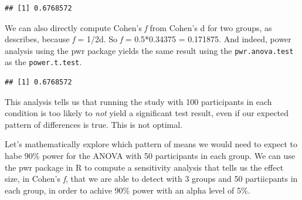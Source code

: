 \documentclass[
]{book}
\newenvironment{Shaded}{\begin{snugshade}}{\end{snugshade}}
\newcommand{\DataTypeTok}[1]{\textcolor[rgb]{0.13,0.29,0.53}{#1}}
\newcommand{\DecValTok}[1]{\textcolor[rgb]{0.00,0.00,0.81}{#1}}
\newcommand{\FloatTok}[1]{\textcolor[rgb]{0.00,0.00,0.81}{#1}}
\newcommand{\KeywordTok}[1]{\textcolor[rgb]{0.13,0.29,0.53}{\textbf{#1}}}
\newcommand{\NormalTok}[1]{#1}
\newcommand{\OperatorTok}[1]{\textcolor[rgb]{0.81,0.36,0.00}{\textbf{#1}}}
\newcommand{\StringTok}[1]{\textcolor[rgb]{0.31,0.60,0.02}{#1}}
\begin{document}
\begin{Shaded}
\end{Shaded}

\begin{verbatim}
## [1] 0.6768572
\end{verbatim}

We can also directly compute Cohen's \emph{f} from Cohen's d for two groups, as \citet{cohen1988spa} describes, because \emph{f} = 1/2d. So \emph{f} = 0.5*0.34375 = 0.171875. And indeed, power analysis using the pwr package yields the same result using the \texttt{pwr.anova.test} as the \texttt{power.t.test}.

\begin{Shaded}
\end{Shaded}

\begin{verbatim}
## [1] 0.6768572
\end{verbatim}

This analysis tells us that running the study with 100 participants in each condition is too likely to \emph{not} yield a significant test result, even if our expected pattern of differences is true. This is not optimal.

Let's mathematically explore which pattern of means we would need to expect to habe 90\% power for the ANOVA with 50 participants in each group. We can use the pwr package in R to compute a sensitivity analysis that tells us the effect size, in Cohen's \emph{f}, that we are able to detect with 3 groups and 50 partiicpants in each group, in order to achive 90\% power with an alpha level of 5\%.
\end{document}
